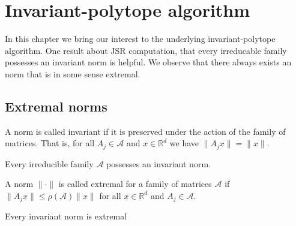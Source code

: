 
\chapter{Invariant-polytope algorithm}
\label{ch:inv.poly}	

In this chapter we bring our interest to the underlying invariant-polytope algorithm. 
One result about JSR computation, that every irreducable family possesses an invariant norm is helpful. We observe that there always exists an norm that is in some sense extremal. 

\section{Extremal norms}
\label{sec:extremal-norms}

A norm is called invariant if it is preserved under the action of the family of matrices. That is, for all $A_j \in \mathcal{A}$ and $x \in \mathbb{R}^d$ we have $\lVert A_j x \rVert = \lVert x \rVert$.

\begin{theorem}
    Every irreducible family $\mathcal{A}$ possesses an invariant norm.
\end{theorem}

\begin{definition}
    A norm $\lVert \cdot \rVert$ is called extremal for a family of matrices $\mathcal{A}$ if $\lVert A_j x \rVert \leq \rho(\mathcal{A}) \lVert x \rVert$ for all $x \in \mathbb{R}^d$ and $A_j \in \mathcal{A}$.
\end{definition}

Every invariant norm is extremal


